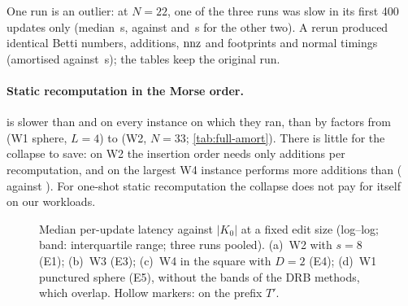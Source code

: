 One run is an outlier: at $N=22$, one of the three  runs was
slow in its first 400 updates only (median \NumOutlierSeedOneBlockOneMed\,\textmu s,
against \NumOutlierSeedZeroBlockOneMed{} and \NumOutlierSeedTwoBlockOneMed\,\textmu s
for the other two). A rerun produced identical Betti numbers, additions, $\operatorname{nnz}$
and footprints and normal timings (amortised \NumOutlierRerunAmort{} against
\NumOutlierOrigAmort\,\textmu s); the tables keep the original run.

\paragraph{Static recomputation in the Morse order.}
 is slower than  and  on
every instance on which they ran, than  by factors from \NumWOneSphereLFourFullMorseOverFullId{} (W1 sphere,
$L=4$) to \NumWTwoNThirtyThreeSEightFullMorseOverFullId{} (W2, $N=33$;
\cref{tab:full-amort}). There is little for the collapse to save: on W2 the
insertion order needs only \NumWTwoNThirtyThreeSEightFullIdAdds{} additions per
recomputation, and on the largest W4 instance  performs more
additions than  (\NumWFourPlaneNSixteenThousandDTwoFullMorseAdds{}
against \NumWFourPlaneNSixteenThousandDTwoFullIdAdds). For one-shot static
recomputation the collapse does not pay for itself on our workloads.

\begin{figure}[t]
  \centering
  \caption{Median per-update latency against $|K_0|$ at a fixed edit size
    (log--log; band: interquartile range; three runs pooled). (a)~W2 with $s=8$
    (E1); (b)~W3 (E3); (c)~W4 in the square with $D=2$ (E4); (d)~W1 punctured
    sphere (E5), without the bands of the DRB methods, which overlap. Hollow
    markers:  on the prefix $T'$.}
  \label{fig:full-scaling}
\end{figure}

\begin{table}[tp]
  \centering
  \caption{Summary at the largest size of each family of E1, E3, E4 and E5:
    $|K_0|$, the number $T$ of timed updates per run, the median, p95 and
    amortised per-update latency in \textmu s (three runs pooled), and the
    speedup over  (ratio of amortised latencies over all $T$
    updates).  entries with $T={}$\NumPrefix{} cover only the
    first $T'$ updates, and on W3  drifts (\cref{tab:drift}); the text gives
    matched comparisons. Every instance is listed in
    \cref{tab:full-amort,tab:full-p99}.}
  \label{tab:summary-largest}
  \small
\end{table}

